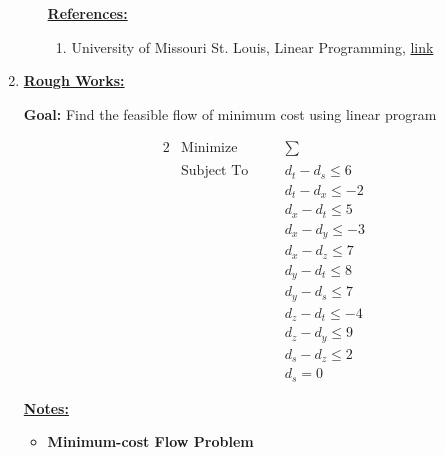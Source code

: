 \documentclass[12pt]{article}
\begin{document}
\begin{enumerate}[1.]
\begin{itemize}
        \underline{\textbf{References:}}

        \bigskip

        \begin{enumerate}[1)]
            \item University of Missouri St. Louis, Linear Programming, \href{http://umsl.edu/~adhikarib/cs4130-fall2017/slides/10%20-%20Linear%20Programming.pdf}{link}
        \end{enumerate}
    \end{itemize}

    \item

    \bigskip

    \underline{\textbf{Rough Works:}}

    \bigskip

    \textbf{Goal:} Find the feasible flow of minimum cost using linear program

    \bigskip

    \begin{alignat*}{2}
        & \text{Minimize}   & \quad & \sum\limits_{}           \\
        & \text{Subject To} &       & d_t - d_s \leq 6 \\
        &                   &       & d_t - d_x \leq -2 \\
        &                   &       & d_x - d_t \leq 5 \\
        &                   &       & d_x - d_y \leq -3 \\
        &                   &       & d_x - d_z \leq 7 \\
        &                   &       & d_y - d_t \leq 8 \\
        &                   &       & d_y - d_s \leq 7 \\
        &                   &       & d_z - d_t \leq -4 \\
        &                   &       & d_z - d_y \leq 9 \\
        &                   &       & d_s - d_z \leq 2 \\
        &                   &       & d_s = 0
    \end{alignat*}

    \underline{\textbf{Notes:}}

    \bigskip

    \begin{itemize}
        \item \textbf{Minimum-cost Flow Problem}


\end{itemize}
\end{enumerate}
\end{document}
